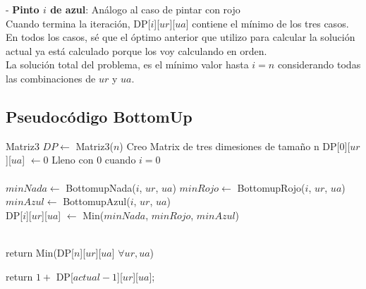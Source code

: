 - \textbf{Pinto $i$ de azul}:  Análogo al caso de pintar con rojo  \\

Cuando termina la iteración, DP[$i$][$ur$][$ua$] contiene el mínimo de los tres casos. En todos los casos, sé que el óptimo anterior que utilizo para calcular la solución actual ya está calculado porque los voy calculando en orden. \\

La solución total del problema, es el mínimo valor hasta $i = n$ considerando todas las combinaciones de $ur$ y $ua$.

\subsection{Pseudocódigo BottomUp}

\begin{algorithm}[H]
\begin{algorithmic}
  \State Matriz3 $DP \gets$ Matriz3($n$)  \Comment Creo Matrix de tres dimesiones de tamaño n 
  \State DP[$0$][$ur$][$ua$] $\gets 0$  \Comment Lleno con $0$ cuando $i = 0$ \\

             \\

                \State $minNada \gets$ BottomupNada($i$, $ur$, $ua$)
                \State $minRojo \gets$ BottomupRojo($i$, $ur$, $ua$)
                \State $minAzul \gets$ BottomupAzul($i$, $ur$, $ua$) \\  

                \State DP[$i$][$ur$][$ua$] $\gets$ Min($minNada$, $minRojo$, $minAzul$)
            
            \EndFor
        \EndFor
    \EndFor \\

    \State return Min(DP[$n$][$ur$][$ua$] $\forall ur, ua$)

\EndProcedure
\end{algorithmic}
\end{algorithm}


\begin{algorithm}[H]
\begin{algorithmic}
    \State return $1 +$ DP[$actual-1$][$ur$][$ua$];
\EndProcedure
\end{algorithmic}
\end{algorithm}


